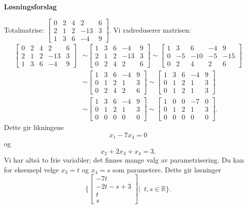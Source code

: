 \documentclass[notitlepage,a4paper,12pt,norsk]{IMFeksamen}
\newcommand{\vvvv}[4]{\begin{bmatrix} #1 \\ #2 \\ #3 \\ #4 \end{bmatrix}}
\newcommand{\0}{\V{0}}
\newcommand{\oppgslutt}{
\begin{center}
\pgfornament[width=6cm]{88}
\end{center}
}
\newenvironment{losning}{\begin{oppgave}}{\oppgslutt\end{oppgave}}
\begin{document}
\begin{center}
\textbf{\large Løsningsforslag} \\[3pt]
\end{center}
\vspace{-10pt}


\begin{losning}
Totalmatrise:
$
\begin{bmatrix}
0 & 2 & 4 &   2 & 6 \\
2 & 1 & 2 & -13 & 3 \\
1 & 3 & 6 &  -4 & 9
\end{bmatrix}
$.
Vi radreduserer matrisen:
\begin{align*}
\begin{bmatrix}
0 & 2 & 4 &   2 & 6 \\
2 & 1 & 2 & -13 & 3 \\
1 & 3 & 6 &  -4 & 9
\end{bmatrix}
&\sim 
\begin{bmatrix}
1 & 3 & 6 &  -4 & 9 \\
2 & 1 & 2 & -13 & 3 \\
0 & 2 & 4 &   2 & 6
\end{bmatrix}
\sim
\begin{bmatrix}
1 & 3 & 6 &  -4 & 9 \\
0 & -5 & -10 & -5 & -15 \\
0 & 2 & 4 &   2 & 6
\end{bmatrix}\\
&\sim 
\begin{bmatrix}
1 & 3 & 6 &  -4 & 9 \\
0 & 1 & 2 & 1 & 3 \\
0 & 2 & 4 &   2 & 6
\end{bmatrix}
\sim
\begin{bmatrix}
1 & 3 & 6 &  -4 & 9 \\
0 & 1 & 2 & 1 & 3 \\
0 & 1 & 2 & 1 & 3
\end{bmatrix}\\
&\sim 
\begin{bmatrix}
1 & 3 & 6 &  -4 & 9 \\
0 & 1 & 2 & 1 & 3 \\
0 & 0 & 0 &  0 & 0
\end{bmatrix}
\sim
\begin{bmatrix}
1 & 0 & 0 &  -7 & 0 \\
0 & 1 & 2 & 1 & 3 \\
0 & 0 & 0 &  0 & 0
\end{bmatrix}.
\end{align*}
Dette gir likningene 
$$x_1-7x_4=0$$
og $$x_2+2x_3+x_4=3.$$
Vi har altså to frie variabler; det finnes mange valg av parametrisering. Du kan for eksemepl velge $x_3=t$ og $x_4=s$ som parametere. Dette gir løsninger
$$\{\vvvv{-7t}{-2t-s+3}{t}{s}|\;\; t,s \in \mathbb{R}\}.$$
\end{losning}
\end{document}
